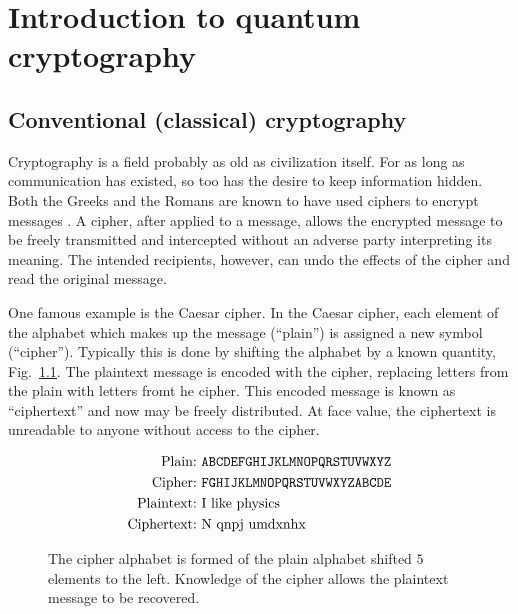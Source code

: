 \chapter{Introduction to quantum cryptography}\label{chapter:crypto_intro}

\section{Conventional (classical) cryptography}

Cryptography is a field probably as old as civilization itself. For as long as communication has existed, so too has the desire to keep information hidden. Both the Greeks and the Romans are known to have used ciphers to encrypt messages \cite{Singh2000}. A cipher, after applied to a message, allows the encrypted message to be freely transmitted and intercepted without an adverse party interpreting its meaning. The intended recipients, however, can undo the effects of the cipher and read the original message. 

One famous example is the Caesar cipher. In the Caesar cipher, each element of the alphabet which makes up the message (``plain'') is assigned a new symbol (``cipher''). Typically this is done by shifting the alphabet by a known quantity, Fig.~\ref{fig:caesar}. The plaintext message is encoded with the cipher, replacing letters from the plain with letters fromt he cipher. This encoded message is known as ``ciphertext'' and now may be freely distributed. At face value, the ciphertext is unreadable to anyone without access to the cipher.

\begin{figure}[htp]
\centering
\captionsetup{width=\linewidth}
\begin{framed}
\begin{align*}
\text{Plain:} &\text{  \texttt{ABCDEFGHIJKLMNOPQRSTUVWXYZ}} \\
\text{Cipher:} &\text{  \texttt{FGHIJKLMNOPQRSTUVWXYZABCDE}} \\
\text{Plaintext:} &\text{  I like physics} \\
\text{Ciphertext:} &\text{  N qnpj umdxnhx}
\end{align*}
\end{framed}
\caption{\label{fig:caesar} The cipher alphabet is formed of the plain alphabet shifted $5$ elements to the left. Knowledge of the cipher allows the plaintext message to be recovered.}
\end{figure} %


